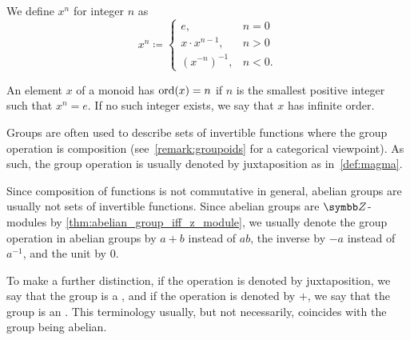 \begin{definition}
  We define \( x^n \) for integer \( n \) as
  \begin{equation*}
    x^n \coloneqq \begin{cases}
      e, &n = 0 \\
      x \cdot x^{n-1}, &n > 0 \\
      (x^{-n})^{-1}, &n < 0.
    \end{cases}
  \end{equation*}

  An element \( x \) of a monoid has  \( \operatorname{ord}(x) = n \) if \( n \) is the smallest positive integer such that \( x^n = e \). If no such integer exists, we say that \( x \) has infinite order.
\end{definition}

\begin{remark}\label{remark:additive_group}
  Groups are often used to describe sets of invertible functions where the group operation is composition (see~\cref{remark:groupoids} for a categorical viewpoint). As such, the group operation is usually denoted by juxtaposition as in~\cref{def:magma}.

  Since composition of functions is not commutative in general, abelian groups are usually not sets of invertible functions. Since abelian groups are \( \Z \)-modules by \cref{thm:abelian_group_iff_z_module}, we usually denote the group operation in abelian groups by \( a + b \) instead of \( ab \), the inverse by \( -a \) instead of \( a^{-1} \), and the unit by \( 0 \).

  To make a further distinction, if the operation is denoted by juxtaposition, we say that the group is a , and if the operation is denoted by \( + \), we say that the group is an . This terminology usually, but not necessarily, coincides with the group being abelian.
\end{remark}

